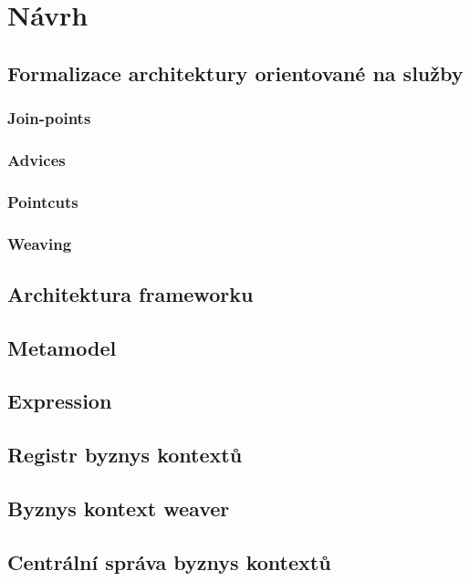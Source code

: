 
\chapter{N\'avrh}\label{ch:navrh}

\section{Formalizace architektury orientované na služby}

\subsection{Join-points}

\subsection{Advices}

\subsection{Pointcuts}

\subsection{Weaving}

\section{Architektura frameworku}

\section{Metamodel}

\section{Expression}

\section{Registr byznys kontextů}

\section{Byznys kontext weaver}

\section{Centrální správa byznys kontextů}
